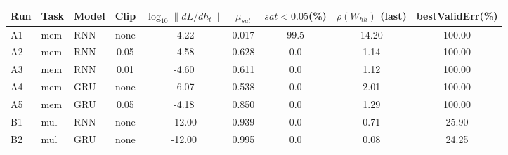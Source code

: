 \begin{tabular}{lllcccccc}
\toprule
Run & Task & Model & Clip & $\log_{10}\|dL/dh_t\|$ & $\mu_{sat}$ & $sat<0.05$(\%) & $\rho(W_{hh})$ (last) & bestValidErr(\%) \\
\midrule
A1 & mem & RNN & none & -4.22 & 0.017 & 99.5 & 14.20 & 100.00 \\
A2 & mem & RNN & 0.05 & -4.58 & 0.628 & 0.0 & 1.14 & 100.00 \\
A3 & mem & RNN & 0.01 & -4.60 & 0.611 & 0.0 & 1.12 & 100.00 \\
A4 & mem & GRU & none & -6.07 & 0.538 & 0.0 & 2.01 & 100.00 \\
A5 & mem & GRU & 0.05 & -4.18 & 0.850 & 0.0 & 1.29 & 100.00 \\
B1 & mul & RNN & none & -12.00 & 0.939 & 0.0 & 0.71 & 25.90 \\
B2 & mul & GRU & none & -12.00 & 0.995 & 0.0 & 0.08 & 24.25 \\
\bottomrule
\end{tabular}
